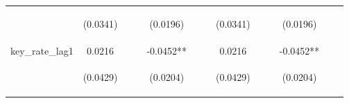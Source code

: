 \documentclass[]{article}
\begin{document}
\begin{center}
\begin{tabular}{lcccccccccccc}
\vspace{4pt} & \begin{footnotesize}(0.0341)\end{footnotesize} & \begin{footnotesize}\end{footnotesize} & \begin{footnotesize}\end{footnotesize} & \begin{footnotesize}(0.0196)\end{footnotesize} & \begin{footnotesize}\end{footnotesize} & \begin{footnotesize}\end{footnotesize} & \begin{footnotesize}(0.0341)\end{footnotesize} & \begin{footnotesize}\end{footnotesize} & \begin{footnotesize}\end{footnotesize} & \begin{footnotesize}(0.0196)\end{footnotesize} & \begin{footnotesize}\end{footnotesize} & \begin{footnotesize}\end{footnotesize} \\
key\_rate\_lag1 & 0.0216 &  &  & -0.0452** &  &  & 0.0216 &  &  & -0.0452** &  &  \\
\vspace{4pt} & \begin{footnotesize}(0.0429)\end{footnotesize} & \begin{footnotesize}\end{footnotesize} & \begin{footnotesize}\end{footnotesize} & \begin{footnotesize}(0.0204)\end{footnotesize} & \begin{footnotesize}\end{footnotesize} & \begin{footnotesize}\end{footnotesize} & \begin{footnotesize}(0.0429)\end{footnotesize} & \begin{footnotesize}\end{footnotesize} & \begin{footnotesize}\end{footnotesize} & \begin{footnotesize}(0.0204)\end{footnotesize} & \begin{footnotesize}\end{footnotesize} & \begin{footnotesize}\end{footnotesize} \\

\end{tabular}
\end{center}
\end{document}
